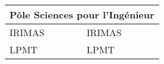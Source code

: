 
\begin{tabularx}{\linewidth}{lX}
	\toprule
	\multicolumn{2}{c}{Pôle Sciences pour l'Ingénieur}\\
	\midrule
	\acrshort{IRIMAS} & \acrlong{IRIMAS}\\
	\acrshort{LPMT} & \acrlong{LPMT}\\
	\bottomrule
\end{tabularx}
